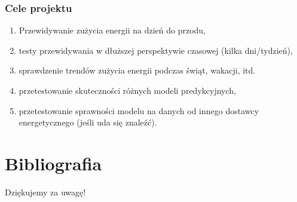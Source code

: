\documentclass[]{beamer}
\begin{document}
\begin{frame}
\frametitle{Cele projektu}
\vspace{-1cm}


\begin{enumerate}
  \item Przewidywanie zużycia energii na dzień do przodu,
  \item testy przewidywania w dłuższej perspektywie czasowej (kilka dni/tydzień),
  \item sprawdzenie trendów zużycia energii podczas świąt, wakacji, itd.
  \item przetestowanie skuteczności różnych modeli predykcyjnych,
  \item przetestowanie sprawności modelu na danych od innego dostawcy energetycznego (jeśli uda się znaleźć).
\end{enumerate}
\end{frame}

\section{Bibliografia}

\begin{frame}
  \centering
  \huge{
    Dziękujemy za uwagę!}
\end{frame}





\end{document}
